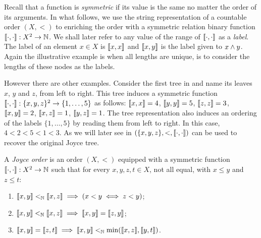 Recall that a function is \emph{symmetric} if its value is the same no matter the order of its arguments. In what follows, we use the string representation of a countable order $(X, <)$ to enriching the order with a symmetric relation binary function $\llbracket \cdot , \cdot \rrbracket: X^2\to \mathbb{N}$.   We shall later refer to any value of the range of $\meetlevel{\cdot}{\cdot}$ as a \emph{label}.   %
The label of an element $x \in X$ is $\llbracket x , x \rrbracket$ and $\llbracket x , y \rrbracket$ is the label given to $x \wedge y$. Again the illustrative example is when all lengths are unique, is to consider the lengths of these nodes as the labels.  

However there are other examples. Consider the first tree in  and name its leaves $x$, $y$ and $z$, from left to right. This tree induces a symmetric function $\llbracket \cdot , \cdot \rrbracket: \{x, y, z\}^2 \to \{1, \dots, 5\}$ as follows: $\llbracket x , x \rrbracket = 4$, $\llbracket y , y \rrbracket = 5$, $\llbracket z , z \rrbracket = 3$, $\llbracket x , y \rrbracket = 2$, $\llbracket x , z \rrbracket = 1$, $\llbracket y , z \rrbracket = 1$. The tree representation also induces an ordering of the labels $\{1, \dots, 5\}$ by reading them from left to right. In this case, $4 < 2 < 5 < 1 < 3$. As we will later see in   $(\{x, y, z\}, <, \llbracket \cdot , \cdot \rrbracket)$ can be used to recover the original Joyce tree. 



%


\begin{definition}\label{def:jo}\index{$\meetlevel{\cdot}{\cdot}$}
  A \emph{Joyce order} is an order $(X,<)$ equipped with a symmetric function $\llbracket \cdot , \cdot \rrbracket: X^2\to \mathbb{N}$ such that for every $x, y, z, t\in X$, not all equal, with $x\leq y$ and $z\leq t$:
  \begin{enumerate}
  \item[\Jo{1}] $\llbracket x , y \rrbracket <_{\mathbb{N}} \llbracket x , z \rrbracket\implies(x< y\iff z< y)$;
  \item[\Jo{2}] $\llbracket x , y \rrbracket<_{\mathbb{N}}\llbracket x , z \rrbracket\implies\llbracket x , y \rrbracket = \llbracket z , y \rrbracket$;
  \item[\Jo{3}] $\llbracket x , y \rrbracket=\llbracket z , t \rrbracket\implies \llbracket x , y \rrbracket<_{\mathbb{N}}\min(\llbracket x , z \rrbracket, \llbracket y , t \rrbracket)$.
  \end{enumerate}
\end{definition}

